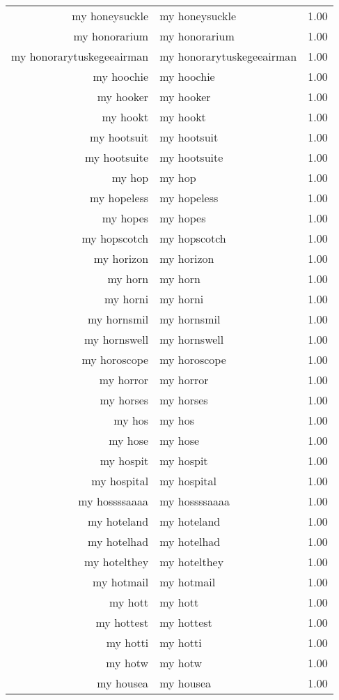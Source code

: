 \begin{table}[ht]
\begin{tabular}{rlr}
  my honeysuckle & my honeysuckle & 1.00 \\ 
  my honorarium & my honorarium & 1.00 \\ 
  my honorarytuskegeeairman & my honorarytuskegeeairman & 1.00 \\ 
  my hoochie & my hoochie & 1.00 \\ 
  my hooker & my hooker & 1.00 \\ 
  my hookt & my hookt & 1.00 \\ 
  my hootsuit & my hootsuit & 1.00 \\ 
  my hootsuite & my hootsuite & 1.00 \\ 
  my hop & my hop & 1.00 \\ 
  my hopeless & my hopeless & 1.00 \\ 
  my hopes & my hopes & 1.00 \\ 
  my hopscotch & my hopscotch & 1.00 \\ 
  my horizon & my horizon & 1.00 \\ 
  my horn & my horn & 1.00 \\ 
  my horni & my horni & 1.00 \\ 
  my hornsmil & my hornsmil & 1.00 \\ 
  my hornswell & my hornswell & 1.00 \\ 
  my horoscope & my horoscope & 1.00 \\ 
  my horror & my horror & 1.00 \\ 
  my horses & my horses & 1.00 \\ 
  my hos & my hos & 1.00 \\ 
  my hose & my hose & 1.00 \\ 
  my hospit & my hospit & 1.00 \\ 
  my hospital & my hospital & 1.00 \\ 
  my hossssaaaa & my hossssaaaa & 1.00 \\ 
  my hoteland & my hoteland & 1.00 \\ 
  my hotelhad & my hotelhad & 1.00 \\ 
  my hotelthey & my hotelthey & 1.00 \\ 
  my hotmail & my hotmail & 1.00 \\ 
  my hott & my hott & 1.00 \\ 
  my hottest & my hottest & 1.00 \\ 
  my hotti & my hotti & 1.00 \\ 
  my hotw & my hotw & 1.00 \\ 
  my housea & my housea & 1.00 \\ 

\end{tabular}
\end{table}
